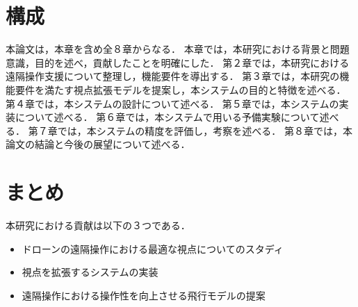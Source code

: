 \section{構成}
本論文は，本章を含め全８章からなる．
本章では，本研究における背景と問題意識，目的を述べ，貢献したことを明確にした．
第２章では，本研究における遠隔操作支援について整理し，機能要件を導出する．
第３章では，本研究の機能要件を満たす視点拡張モデルを提案し，本システムの目的と特徴を述べる．
第４章では，本システムの設計について述べる．
第５章では，本システムの実装について述べる．
第６章では，本システムで用いる予備実験について述べる．
第７章では，本システムの精度を評価し，考察を述べる．
第８章では，本論文の結論と今後の展望について述べる．

\section{まとめ}
本研究における貢献は以下の３つである．
\begin{itemize}
 \item ドローンの遠隔操作における最適な視点についてのスタディ
 \item 視点を拡張するシステムの実装
 \item 遠隔操作における操作性を向上させる飛行モデルの提案
\end{itemize}


